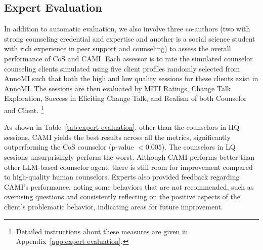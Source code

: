\begin{comment}
\begin{table}[tb]
\centering
\resizebox{0.49\textwidth}{!}{
\begin{tabular}{ccc}
\toprule
Client                   & \multicolumn{2}{c}{Counselor} \\ \cline{2-3} 
\multicolumn{1}{c}{Topic Distance} & State Inference  & Exploration Direction  \\ \midrule
\multicolumn{3}{c}{\cellcolor[HTML]{E0E0E0}GPT-4o Based Counselor}                      \\
\multicolumn{1}{c}{74.92}          & 93.32             & 67.81                  \\ \midrule
\multicolumn{3}{c}{\cellcolor[HTML]{E0E0E0}Llama-3.1 70B Based Counselor}              \\
\multicolumn{1}{c}{70.14}          & 88.56             & 54.36                  \\ \bottomrule
\end{tabular}}
\caption{Results of the mutual perception ability of both the client and counselor within the generation framework. The GPT-4o-based client performs well in distinguishing between topics. Counselors with both LLM backbones perform well in state inference but struggle with accurately perceiving client feedback.}
\label{tab:perception}
\end{table}
\end{comment}


\subsection{Expert Evaluation}
\label{sec:expert evalution}


In addition to automatic evaluation, we also involve three co-authors (two with strong counseling credential and expertise and another is a social science student with rich experience in peer support and counseling) to assess the overall performance of CoS and CAMI. Each assessor is to rate the simulated counselor counseling clients simulated using five client profiles randomly selected from AnnoMI such that both the high and low quality sessions for these clients exist in AnnoMI. The sessions are then evaluated by MITI Ratings, Change Talk Exploration, Success in Eliciting Change Talk, and Realism of both Counselor and Client. \footnote{Detailed instructions about these measures are given in Appendix~\ref{app:expert evaluation}.}

As shown in Table~\ref{tab:expert evaluation}, other than the counselors in HQ sessions, CAMI yields the best results across all the metrics, significantly outperforming the CoS counselor (p-value $< 0.005$). The counselors in LQ sessions unsurprisingly perform the worst. Although CAMI performs better than other LLM-based counselor agent, there is still room for improvement compared to high-quality human counselors. Experts also provided feedback regarding CAMI's performance, noting some behaviors that are not recommended, such as overusing questions and consistently reflecting on the positive aspects of the client's problematic behavior, indicating areas for future improvement.


